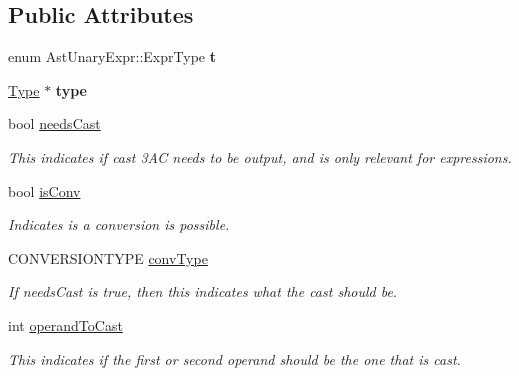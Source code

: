 \subsection*{Public Attributes}
\begin{DoxyCompactItemize}
\item 
\hypertarget{classAstUnaryExpr_a4ca750c972fcd2bec69b7cc81e2bd0de}{enum Ast\-Unary\-Expr\-::\-Expr\-Type {\bfseries t}}\label{classAstUnaryExpr_a4ca750c972fcd2bec69b7cc81e2bd0de}

\item 
\hypertarget{classAstUnaryExpr_aa9c89ebae5cc9ad9a830c3511d38018f}{\hyperlink{classType}{Type} $\ast$ {\bfseries type}}\label{classAstUnaryExpr_aa9c89ebae5cc9ad9a830c3511d38018f}

\item 
\hypertarget{classAST_aaf215802de409f8096c063d01ffa6783}{bool \hyperlink{classAST_aaf215802de409f8096c063d01ffa6783}{needs\-Cast}}\label{classAST_aaf215802de409f8096c063d01ffa6783}

\begin{DoxyCompactList}\small\item\em This indicates if cast 3\-A\-C needs to be output, and is only relevant for expressions. \end{DoxyCompactList}\item 
\hypertarget{classAST_afa9e77ef650ec6664458fa6cb55be985}{bool \hyperlink{classAST_afa9e77ef650ec6664458fa6cb55be985}{is\-Conv}}\label{classAST_afa9e77ef650ec6664458fa6cb55be985}

\begin{DoxyCompactList}\small\item\em Indicates is a conversion is possible. \end{DoxyCompactList}\item 
\hypertarget{classAST_a61ef3317e023d45237e06615b387cd6b}{C\-O\-N\-V\-E\-R\-S\-I\-O\-N\-T\-Y\-P\-E \hyperlink{classAST_a61ef3317e023d45237e06615b387cd6b}{conv\-Type}}\label{classAST_a61ef3317e023d45237e06615b387cd6b}

\begin{DoxyCompactList}\small\item\em If needs\-Cast is true, then this indicates what the cast should be. \end{DoxyCompactList}\item 
\hypertarget{classAST_aea9b07b39d24183f38c0029cec0a878e}{int \hyperlink{classAST_aea9b07b39d24183f38c0029cec0a878e}{operand\-To\-Cast}}\label{classAST_aea9b07b39d24183f38c0029cec0a878e}

\begin{DoxyCompactList}\small\item\em This indicates if the first or second operand should be the one that is cast. \end{DoxyCompactList}\end{DoxyCompactItemize}

